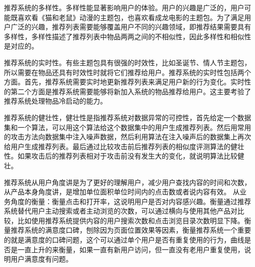   推荐系统的多样性。多样性能显著影响用户的体验。用户的兴趣是广泛的，用户可能既喜欢看《猫和老鼠》动漫的主题包，也喜欢看成龙电影的主题包。为了满足用户广泛的兴趣，推荐列表需要能够覆盖用户不同的兴趣领域，即推荐结果需要具有多样性，多样性描述了推荐列表中物品两两之间的不相似性，因此多样性和相似性是对应的。

  推荐系统的实时性。有些主题包具有很强的时效性，比如圣诞节、情人节主题包，所以需要在物品还具有时效性时就将它们推荐给用户。推荐系统的实时性包括两个方面。首先，推荐系统需要实时地更新推荐列表来满足用户新的行为变化。实时性的第二个方面是推荐系统需要能够将新加入系统的物品推荐给用户。这主要考验了推荐系统处理物品冷启动的能力。

  推荐系统的健壮性，健壮性是指推荐系统对数据异常的可控性，首先给定一个数据集和一个算法，可以用这个算法给这个数据集中的用户生成推荐列表。然后用常用的攻击方法向数据集中注入噪声数据，然后利用算法在注入噪声后的数据集上再次给用户生成推荐列表。最后通过比较攻击前后推荐列表的相似度评测算法的健壮性。如果攻击后的推荐列表相对于攻击前没有发生大的变化，就说明算法比较健壮。

  推荐系统从用户角度讲是为了更好的理解用户，减少用户查找内容的时间和次数，从产品本身角度讲，是增加单位面积单位时间内的点击数或者说内容有效。 从业务角度的衡量：衡量点击和打开率，这说明用户是否对内容感兴趣。衡量通过推荐系统替代用户主动搜索或者主动浏览的次数，可以通过横向与使用其他产品对比较，比如使用推荐系统提供内容的用户搜索次数和点击浏览目录次数明显下降。衡量推荐系统的满意度口碑，刨除因为页面位置效果等因素，衡量推荐系统一个重要的就是满意度的口碑问题，这个可以通过单个用户是否有重复使用的行为，曲线是否是一直上升的来衡量，如果一直有新用户访问，但一直没有老用户重复使用，说明用户满意度有问题。


